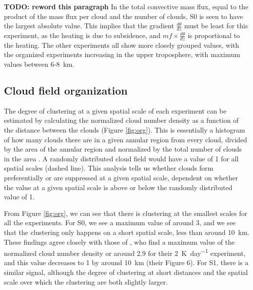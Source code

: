 \documentclass[11pt,a4paper]{article}
\newcommand\todo[1]{\textbf{TODO: #1}}
\begin{document}
\todo{reword this paragraph}
In the total convective mass flux, equal to the product of the mass flux per cloud and the number of clouds, S0 is seen to have the largest absolute value. This implies that the gradient $\frac{d \theta}{dz}$ must be least for this experiment, as the heating is due to subsidence, and $mf \times \frac{d \theta}{dz}$ is proportional to the heating. The other experiments all show more closely grouped values, with the organized experiments increasing in the upper troposphere, with maximum values between \SI{6}{}-\SI{8}{km}. 

\subsection{Cloud field organization}

The degree of clustering at a given spatial scale of each experiment can be estimated by calculating the normalized cloud number density as a function of the distance between the clouds (Figure \ref{fig:org}). This is essentially a histogram of how many clouds there are in a given annular region from every cloud, divided by the area of the annular region and normalized by the total number of clouds in the area \parencite{CC2006II}. A randomly distributed cloud field would have a value of 1 for all spatial scales (dashed line). This analysis tells us whether clouds form preferentially or are suppressed at a given spatial scale, dependent on whether the value at a given spatial scale is above or below the randomly distributed value of 1.

From Figure \ref{fig:org}, we can see that there is clustering at the smallest scales for all the experiments. For S0, we see a maximum value of around 3, and we see that the clustering only happens on a short spatial scale, less than around \SI{10}{km}. These findings agree closely with those of \cite{CC2006II}, who find a maximum value of the normalized cloud number density or around 2.9 for their \SI{2}{K.day^{-1}} experiment, and this value decreases to 1 by around \SI{10}{km} (their Figure 6). For S1, there is a similar signal, although the degree of clustering at short distances and the spatial scale over which the clustering are both slightly larger. 
\end{document}
